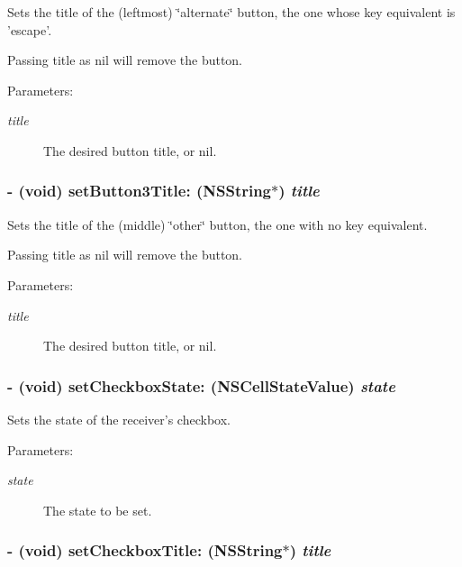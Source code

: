 Sets the title of the (leftmost) \char`\"{}alternate\char`\"{} button, the one whose key equivalent is 'escape'. 

Passing title as nil will remove the button. \begin{Desc}
\item[Parameters:]
\begin{description}
\item[{\em title}]The desired button title, or nil. \end{description}
\end{Desc}
\hypertarget{interface_s_s_y_alert_fad35969716cbdfd1dd97e17b1f53b3a}{
\subsubsection[{setButton3Title:}]{\setlength{\rightskip}{0pt plus 5cm}- (void) setButton3Title: (NSString$\ast$) {\em title}}}
\label{interface_s_s_y_alert_fad35969716cbdfd1dd97e17b1f53b3a}


Sets the title of the (middle) \char`\"{}other\char`\"{} button, the one with no key equivalent. 

Passing title as nil will remove the button. \begin{Desc}
\item[Parameters:]
\begin{description}
\item[{\em title}]The desired button title, or nil. \end{description}
\end{Desc}
\hypertarget{interface_s_s_y_alert_c2c9673b89f04e422a6605887ccea330}{
\subsubsection[{setCheckboxState:}]{\setlength{\rightskip}{0pt plus 5cm}- (void) setCheckboxState: (NSCellStateValue) {\em state}}}
\label{interface_s_s_y_alert_c2c9673b89f04e422a6605887ccea330}


Sets the state of the receiver's checkbox. 

\begin{Desc}
\item[Parameters:]
\begin{description}
\item[{\em state}]The state to be set. \end{description}
\end{Desc}
\hypertarget{interface_s_s_y_alert_4dc3de44c2334f8d871bd01eeffe75b6}{
\subsubsection[{setCheckboxTitle:}]{\setlength{\rightskip}{0pt plus 5cm}- (void) setCheckboxTitle: (NSString$\ast$) {\em title}}}
\label{interface_s_s_y_alert_4dc3de44c2334f8d871bd01eeffe75b6}



